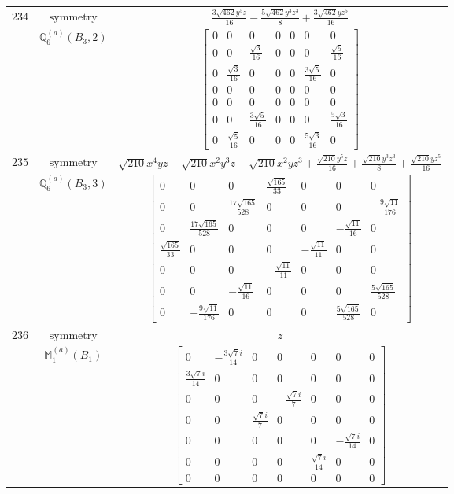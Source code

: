 \documentclass[fleqn,8pt,landscape]{jsarticle}
\begin{document}
\begin{longtable}{ccc}
$ 234 $ & $ \text{symmetry} $ & $ \frac{3 \sqrt{462} y^{5} z}{16} - \frac{5 \sqrt{462} y^{3} z^{3}}{8} + \frac{3 \sqrt{462} y z^{5}}{16} $ \\
$  $ & $ \mathbb{Q}_{6}^{(a)}(B_{3},2) $ & $ \begin{bmatrix} 0 & 0 & 0 & 0 & 0 & 0 & 0 \\ 0 & 0 & \frac{\sqrt{3}}{16} & 0 & 0 & 0 & \frac{\sqrt{5}}{16} \\ 0 & \frac{\sqrt{3}}{16} & 0 & 0 & 0 & \frac{3 \sqrt{5}}{16} & 0 \\ 0 & 0 & 0 & 0 & 0 & 0 & 0 \\ 0 & 0 & 0 & 0 & 0 & 0 & 0 \\ 0 & 0 & \frac{3 \sqrt{5}}{16} & 0 & 0 & 0 & \frac{5 \sqrt{3}}{16} \\ 0 & \frac{\sqrt{5}}{16} & 0 & 0 & 0 & \frac{5 \sqrt{3}}{16} & 0 \end{bmatrix} $ \\ \hline
$ 235 $ & $ \text{symmetry} $ & $ \sqrt{210} x^{4} y z - \sqrt{210} x^{2} y^{3} z - \sqrt{210} x^{2} y z^{3} + \frac{\sqrt{210} y^{5} z}{16} + \frac{\sqrt{210} y^{3} z^{3}}{8} + \frac{\sqrt{210} y z^{5}}{16} $ \\
$  $ & $ \mathbb{Q}_{6}^{(a)}(B_{3},3) $ & $ \begin{bmatrix} 0 & 0 & 0 & \frac{\sqrt{165}}{33} & 0 & 0 & 0 \\ 0 & 0 & \frac{17 \sqrt{165}}{528} & 0 & 0 & 0 & - \frac{9 \sqrt{11}}{176} \\ 0 & \frac{17 \sqrt{165}}{528} & 0 & 0 & 0 & - \frac{\sqrt{11}}{16} & 0 \\ \frac{\sqrt{165}}{33} & 0 & 0 & 0 & - \frac{\sqrt{11}}{11} & 0 & 0 \\ 0 & 0 & 0 & - \frac{\sqrt{11}}{11} & 0 & 0 & 0 \\ 0 & 0 & - \frac{\sqrt{11}}{16} & 0 & 0 & 0 & \frac{5 \sqrt{165}}{528} \\ 0 & - \frac{9 \sqrt{11}}{176} & 0 & 0 & 0 & \frac{5 \sqrt{165}}{528} & 0 \end{bmatrix} $ \\ \hline
$ 236 $ & $ \text{symmetry} $ & $ z $ \\
$  $ & $ \mathbb{M}_{1}^{(a)}(B_{1}) $ & $ \begin{bmatrix} 0 & - \frac{3 \sqrt{7} i}{14} & 0 & 0 & 0 & 0 & 0 \\ \frac{3 \sqrt{7} i}{14} & 0 & 0 & 0 & 0 & 0 & 0 \\ 0 & 0 & 0 & - \frac{\sqrt{7} i}{7} & 0 & 0 & 0 \\ 0 & 0 & \frac{\sqrt{7} i}{7} & 0 & 0 & 0 & 0 \\ 0 & 0 & 0 & 0 & 0 & - \frac{\sqrt{7} i}{14} & 0 \\ 0 & 0 & 0 & 0 & \frac{\sqrt{7} i}{14} & 0 & 0 \\ 0 & 0 & 0 & 0 & 0 & 0 & 0 \end{bmatrix} $ \\ \hline

\end{longtable}
\end{document}
